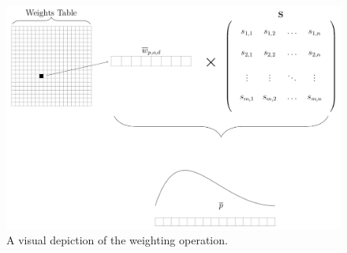 
\begin{figure}[h]
	\centering
	\includegraphics[width=\textwidth]{images/data_methods/weighting.png}
	\caption{A visual depiction of the weighting operation.}
	\label{fig:matmul-proc}
\end{figure}

